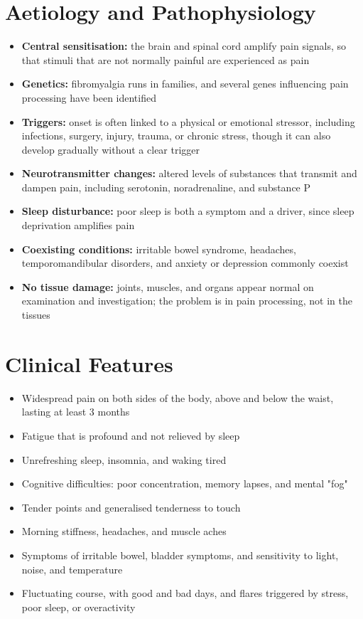 \section*{Aetiology and Pathophysiology}
\begin{itemize}
    \item \textbf{Central sensitisation:} the brain and spinal cord amplify pain signals, so that stimuli that are not normally painful are experienced as pain
    \item \textbf{Genetics:} fibromyalgia runs in families, and several genes influencing pain processing have been identified
    \item \textbf{Triggers:} onset is often linked to a physical or emotional stressor, including infections, surgery, injury, trauma, or chronic stress, though it can also develop gradually without a clear trigger
    \item \textbf{Neurotransmitter changes:} altered levels of substances that transmit and dampen pain, including serotonin, noradrenaline, and substance P
    \item \textbf{Sleep disturbance:} poor sleep is both a symptom and a driver, since sleep deprivation amplifies pain
    \item \textbf{Coexisting conditions:} irritable bowel syndrome, headaches, temporomandibular disorders, and anxiety or depression commonly coexist
    \item \textbf{No tissue damage:} joints, muscles, and organs appear normal on examination and investigation; the problem is in pain processing, not in the tissues
\end{itemize}

\section*{Clinical Features}
\begin{itemize}
    \item Widespread pain on both sides of the body, above and below the waist, lasting at least 3 months
    \item Fatigue that is profound and not relieved by sleep
    \item Unrefreshing sleep, insomnia, and waking tired
    \item Cognitive difficulties: poor concentration, memory lapses, and mental "fog"
    \item Tender points and generalised tenderness to touch
    \item Morning stiffness, headaches, and muscle aches
    \item Symptoms of irritable bowel, bladder symptoms, and sensitivity to light, noise, and temperature
    \item Fluctuating course, with good and bad days, and flares triggered by stress, poor sleep, or overactivity
\end{itemize}

